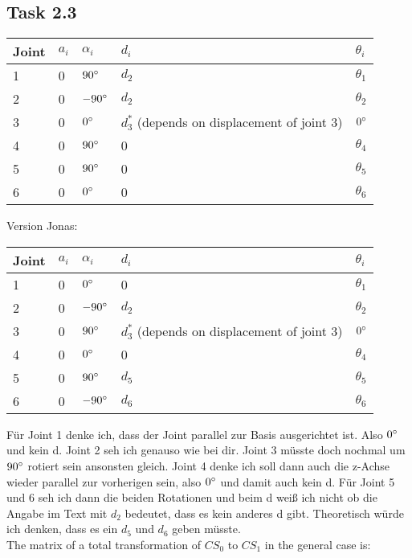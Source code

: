 \subsection*{Task 2.3}

\begin{center}
	\begin{tabular}{ | l | l | l | l | l |}
		\hline
		Joint & $a_{i}$ & $\alpha_{i}$ & $d_i$ & $\theta_i$ \\ \hline
		1 & 0 & $90\degree$ & $d_2$ & $\theta_1$\\ \hline
		2 & 0 & $-90\degree$ & $d_2$ & $\theta_2$\\ \hline
		3 & 0 & $0\degree$ & $d^*_3$ (depends on displacement of joint 3) & $0\degree$\\ \hline
		4 & 0 & $90\degree$ & 0 & $\theta_4$\\ \hline
		5 & 0 & $90\degree$ & 0 & $\theta_5$\\ \hline
		6 & 0 & $0\degree$ & 0 & $\theta_6$\\ \hline
	\end{tabular}
\end{center}

Version Jonas:
\begin{center}
	\begin{tabular}{ | l | l | l | l | l |}
		\hline
		Joint & $a_{i}$ & $\alpha_{i}$ & $d_i$ & $\theta_i$ \\ \hline
		1 & 0 & $0\degree$ & 0 & $\theta_1$\\ \hline
		2 & 0 & $-90\degree$ & $d_2$ & $\theta_2$\\ \hline
		3 & 0 & $90\degree$ & $d^*_3$ (depends on displacement of joint 3) & $0\degree$\\ \hline
		4 & 0 & $0\degree$ & 0 & $\theta_4$\\ \hline
		5 & 0 & $90\degree$ & $d_5$ & $\theta_5$\\ \hline
		6 & 0 & $-90\degree$ & $d_6$ & $\theta_6$\\ \hline
	\end{tabular}
\end{center}
Für Joint 1 denke ich, dass der Joint parallel zur Basis ausgerichtet ist. Also $0\degree$ und kein d. Joint 2 seh ich genauso wie bei dir. Joint 3 müsste doch nochmal um $90\degree$ rotiert sein ansonsten gleich. Joint 4 denke ich soll dann auch die z-Achse wieder parallel zur vorherigen sein, also $0\degree$ und damit auch kein d. Für Joint 5 und 6 seh ich dann die beiden Rotationen und beim d weiß ich nicht ob die Angabe im Text mit $d_2$ bedeutet, dass es kein anderes d gibt. Theoretisch würde ich denken, dass es ein $d_5$ und $d_6$ geben müsste.
\\
The matrix of a total transformation of $CS_0$ to $CS_1$ in the general case is:

